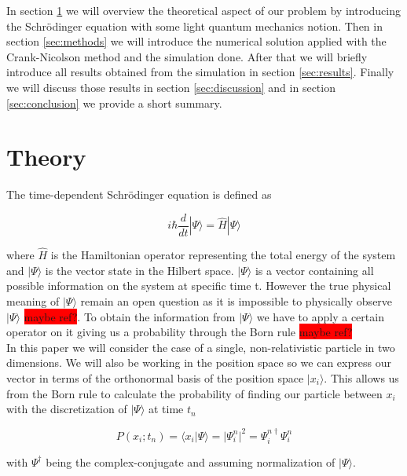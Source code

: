 \documentclass[english,notitlepage,reprint,nofootinbib]{revtex4-2}  %
\begin{document}
	In section \ref{sec:theory} we will overview the theoretical aspect of our problem by introducing
	the Schrödinger equation with some light quantum mechanics notion. Then in section \ref{sec:methods}
	we will introduce the numerical solution applied with the Crank-Nicolson method and the simulation
	done. After that we will briefly introduce all results obtained from the simulation in section 
	\ref{sec:results}. Finally we will discuss those results in section \ref{sec:discussion} and
	in section  \ref{sec:conclusion} we provide a short summary. 
	
	
	\section{Theory} \label{sec:theory}
	The time-dependent Schrödinger equation is defined as
	
	\begin{equation}
	i \hbar \frac{d}{d t}|\Psi\rangle=\hat{H}|\Psi\rangle \label{eq:schro_eq}
	\end{equation}
	
	where $\hat{H}$ is the Hamiltonian operator representing the total energy of the system
	and $|\Psi\rangle$ is the vector state in the Hilbert space. $|\Psi\rangle$ is a vector 
	containing all possible information on the system at specific time t. However the true 
	physical meaning of $|\Psi\rangle$ remain an open question as it is impossible to 
	physically observe $|\Psi\rangle$ \colorbox{red}{maybe ref?}. To obtain the information
	from $|\Psi\rangle$ we have to apply a certain operator on it giving us a probability 
	through the Born rule \colorbox{red}{maybe ref?} \\

	
	In this paper we will consider the case of a single, non-relativistic particle in two dimensions. We will also be working in the position space so we can express our vector
	in terms of the orthonormal basis of the position space $|x_i\rangle$. This allows us 
	from the Born rule to calculate the probability of finding our particle between 
	$x_i$ with the discretization of  $|\Psi\rangle$  at time $t_n$
	
	\begin{equation}
		P(x_i;t_n) = \langle x_i |\Psi\rangle = |\Psi^n_i|^2 =  \Psi^{n\dagger}_i\Psi^n_i
	\end{equation}
	
	with $\Psi^\dagger$ being the complex-conjugate and assuming normalization of $
	|\Psi\rangle$. \\
	
\end{document}
